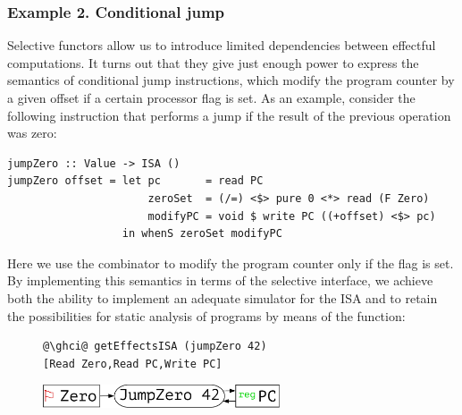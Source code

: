 \subsubsection{Example 2. Conditional jump}

Selective functors allow us to introduce limited dependencies between
effectful computations. It turns out that they give just enough power to
express the semantics of conditional jump instructions, which modify the program
counter by a given offset if a certain processor flag is set. As an example,
consider the following instruction that performs a jump if the result of the
previous operation was zero:

\vspace{1mm}
\begin{verbatim}
jumpZero :: Value -> ISA ()
jumpZero offset = let pc       = read PC
                      zeroSet  = (/=) <$> pure 0 <*> read (F Zero)
                      modifyPC = void $ write PC ((+offset) <$> pc)
                  in whenS zeroSet modifyPC
\end{verbatim}
\vspace{1mm}

\noindent
Here we use the  combinator to modify the program counter only if
the  flag is set. By implementing this semantics in terms of the
selective interface, we achieve both the ability to implement an adequate
simulator for the ISA and to retain the possibilities for static analysis of
programs by means of the  function:

\begin{figure}[!h]
 \begin{minipage}{0.45\textwidth}
\raggedleft
\begin{verbatim}
@\ghci@ getEffectsISA (jumpZero 42)
[Read Zero,Read PC,Write PC]
\end{verbatim}
 \end{minipage}
 \begin{minipage}{0.45\textwidth}
  \centering
  \includegraphics[width=7cm]{./fig/jumpZero.pdf}
 \end{minipage}
\end{figure}

